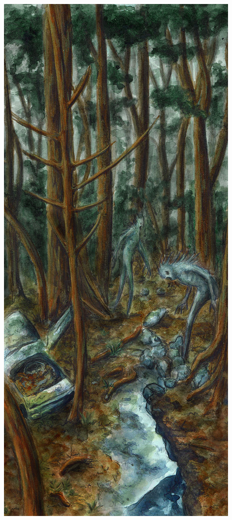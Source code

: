 \documentclass[10pt,twoside,twocolumn,openany,bg=print,justified]{dndbook}
\begin{document}
\includegraphics[width=\columnwidth, keepaspectratio]{img/monstre_foret.jpg}
\end{document}
